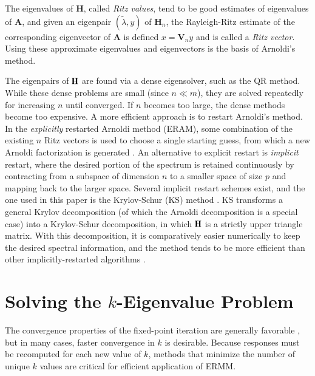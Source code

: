 The eigenvalues of $\mathbf{H}$, called {\it Ritz values}, tend to
be good estimates of eigenvalues of $\mathbf{A}$, and given an eigenpair
$(\tilde{\lambda}, y)$ of $\mathbf{H}_n$, the Rayleigh-Ritz estimate of the
corresponding eigenvector of $\mathbf{A}$ is defined $x = \mathbf{V}_n y$ and
is called a {\it Ritz vector}.  Using these approximate 
eigenvalues and eigenvectors is the basis of Arnoldi's method.

The eigenpairs of $\mathbf{H}$ are found via a dense eigensolver, such as 
the QR method.  While these dense problems are small (since $n \ll m$), 
they are solved repeatedly for increasing $n$ until converged.  
If $n$ becomes too large, the dense methods become too expensive.  A 
more efficient approach is to restart Arnoldi's method. In 
the {\it explicitly} restarted Arnoldi method (ERAM), some combination of 
the existing $n$ Ritz vectors is used to choose a single starting guess, 
from which a new Arnoldi factorization is generated \cite{slepc}.
An alternative to explicit restart is {\it implicit} restart, where the 
desired portion of the spectrum is retained continuously by contracting 
from a subspace of dimension $n$ to a smaller space of size $p$ and mapping 
back to the larger space. 
Several implicit restart schemes exist, and the one used in this paper 
is the Krylov-Schur (KS) method
\cite{stewart2002ksa}.  KS transforms a general Krylov decomposition 
(of which the Arnoldi decomposition is a special case) into a Krylov-Schur 
decomposition, in which $\mathbf{H}$ is a strictly upper triangle matrix.
With this decomposition, it is comparatively
easier numerically to keep the desired spectral information, and the 
method tends to be more efficient than other implicitly-restarted 
algorithms \cite{slepc}. 

\section{Solving the $k$-Eigenvalue Problem}
\label{sec:outer}

The convergence properties of the fixed-point iteration
are generally favorable \cite{roberts2014arm}, but in many cases,
faster convergence in $k$ is desirable.  Because responses 
must be recomputed for each new value of $k$,  methods that 
minimize the number of unique $k$ values are critical for 
efficient application of ERMM.

